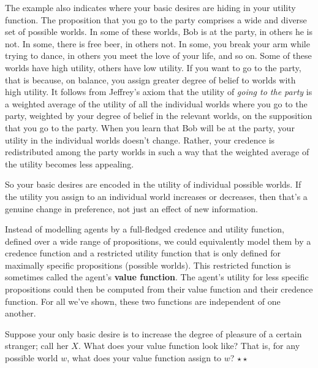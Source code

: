 The example also indicates where your basic desires are hiding in your
utility function. The proposition that you go to the party comprises a
wide and diverse set of possible worlds. In some of these worlds, Bob
is at the party, in others he is not. In some, there is free beer, in
others not. In some, you break your arm while trying to dance, in
others you meet the love of your life, and so on. Some of these worlds have high
utility, others have low utility. If you want to go to the party, that
is because, on balance, you assign greater degree of belief to worlds
with high utility. It follows from Jeffrey's axiom that the utility of
\emph{going to the party} is a weighted average of the utility of all
the individual worlds where you go to the party, weighted by your
degree of belief in the relevant worlds, on the supposition that you
go to the party. When you learn that Bob will be at the party, your
utility in the individual worlds doesn't change. Rather, your credence
is redistributed among the party worlds in such a way that the
weighted average of the utility becomes less appealing.

So your basic desires are encoded in the utility of individual
possible worlds. If the utility you assign to an individual world
increases or decreases, then that's a genuine change in preference,
not just an effect of new information.

Instead of modelling agents by a full-fledged credence and utility
function, defined over a wide range of propositions, we could
equivalently model them by a credence function and a restricted
utility function that is only defined for maximally specific
propositions (possible worlds). This restricted function is
sometimes called the agent's \textbf{value function}. The agent's
utility for less specific propositions could then be computed from
their value function and their credence function. For all we've shown,
these two functions are independent of one another.

\begin{exercise}
  Suppose your only basic desire is to increase the degree of pleasure
  of a certain stranger; call her $X$. What does your value function
  look like? That is, for any possible world $w$, what does your value
  function assign to $w$?  $\star\star$

\end{exercise}

